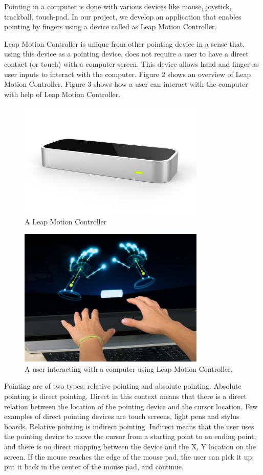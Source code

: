 \documentclass{article}
\begin{document}
Pointing in a computer is done with various devices like mouse, joystick, trackball, touch-pad. In our project, we develop an application that enables pointing by fingers using a device called as Leap Motion Controller.

Leap Motion Controller is unique from other pointing device in a sense that, using this device as a pointing device, does not require a user to have a direct contact (or touch) with a computer screen. This device allows hand and finger as user inputs to interact with the computer. Figure 2 shows an overview of Leap Motion Controller. Figure 3 shows how a user can interact with the computer with help of Leap Motion Controller.

\begin{figure}[!h]
\centering
\includegraphics[width=3.5in]{Figure_2}
\caption{A Leap Motion Controller}
\end{figure}

\begin{figure}[!h]
\centering
\includegraphics[width=3.5in]{Figure_3}
\caption{A user interacting with a computer using Leap Motion Controller.}
\end{figure}

Pointing are of two types: relative pointing and absolute pointing. Absolute pointing \cite{1} is direct pointing. Direct in this context means that there is a direct relation between the location of the pointing device and the cursor location. Few examples of direct pointing devices are touch screens, light pens and stylus boards. Relative pointing \cite{1} is indirect pointing. Indirect means that the user uses the pointing device to move the cursor from a starting point to an ending point, and there is no direct mapping between the device and the X, Y location on the screen. If the mouse reaches the edge of the mouse pad, the user can pick it up, put it back in the center of the mouse pad, and continue.   
\end{document}
